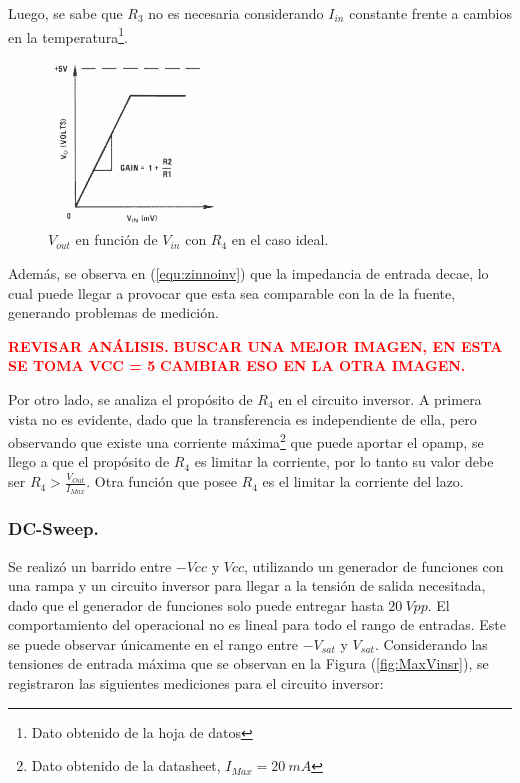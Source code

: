 Luego, se sabe que $R_3$ no es necesaria considerando $I_{in}$ constante frente a cambios en la temperatura\footnote{Dato obtenido de la hoja de datos}.

\begin{figure}[H]	
	\centering
	\includegraphics[width=0.4\textwidth]{Ejercicio1/Imagenes/VinvsVoR3.png}
	\caption{$V_{out}$ en función de $V_{in}$ con $R_4$ en el caso ideal.}
	\label{fig:VinvsVoR3}
\end{figure} 

Además, se observa en (\ref{equ:zinnoinv}) que la impedancia de entrada decae, lo cual puede llegar a provocar que esta sea comparable con la de la fuente, generando problemas de medición.

\begin{center}
\textcolor{red}{\textbf{REVISAR ANÁLISIS.}}
\textcolor{red}{\textbf{BUSCAR UNA MEJOR IMAGEN, EN ESTA SE TOMA VCC = 5}}
\textcolor{red}{\textbf{CAMBIAR ESO EN LA OTRA IMAGEN.}}
\end{center}

Por otro lado, se analiza el propósito de $R_4$ en el circuito inversor. A primera vista no es evidente, dado que la transferencia es independiente de ella, pero observando que existe una corriente máxima\footnote{Dato obtenido de la datasheet, $I_{Max}=20 \ mA$} que puede aportar el opamp, se llego a que el propósito de $R_4$ es limitar la corriente, por lo tanto su valor debe ser $R_4>\frac{V_{Out}}{I_{Max}}$. Otra función que posee $R_4$ es el limitar la corriente del lazo.

\subsubsection{DC-Sweep.}
Se realizó un barrido entre $-Vcc$ y $Vcc$, utilizando un generador de funciones con una rampa y un circuito inversor para llegar a la tensión de salida necesitada, dado que el generador de funciones solo puede entregar hasta $20 \ Vpp$.
El comportamiento del operacional no es lineal para todo el rango de entradas. Este se puede observar únicamente en el rango entre $-V_{sat}$ y $V_{sat}$. Considerando las tensiones de entrada máxima que se observan en la Figura (\ref{fig:MaxVinsr}), se registraron las siguientes mediciones para el circuito inversor:

